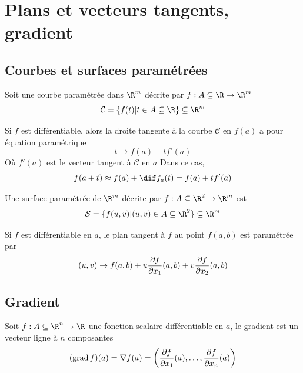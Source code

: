 
\section{Plans et vecteurs tangents, gradient}

\subsection{Courbes et surfaces paramétrées}

\begin{mydef}
	Soit une courbe paramétrée dans $\R^m$ décrite par $f : A \subseteq \R \to \R^m$
	\[ \mathcal{C} = \{ f(t) | t \in A \subseteq \R \} \subseteq \R^m \]
\end{mydef}

\begin{myform}
	Si $f$ est différentiable, alors la droite tangente à la courbe $\mathcal{C}$ en $f(a)$ a pour équation paramétrique
	\[ t \to f(a) + t f'(a) \]
	Où $f'(a)$ est le vecteur tangent à $\mathcal{C}$ en $a$
	Dans ce cas,
	\[ f(a + t) \approx f(a) + \dif f_a(t) = f(a) + t f'(a) \]
\end{myform}

\begin{mydef}
	Une surface paramétrée de $\R^m$ décrite par $f : A \subseteq \R^2 \to \R^m$ est
	\[ \mathcal{S} = \{ f(u,v) | (u,v) \in A \subseteq \R^2 \} \subseteq \R^m \]
\end{mydef}

\begin{myform}
	Si $f$ est différentiable en $a$, le plan tangent à $f$ au point $f(a,b)$ est paramétrée par
	\[ (u,v) \to f(a,b) + u \frac{\partial f}{\partial x_1} (a,b) + v \frac{\partial f}{\partial x_2}(a,b) \]
\end{myform}

\subsection{Gradient}

\begin{mydef}[Gradient] Soit $f : A \subseteq \R^n \to \R$ une fonction scalaire différentiable en $a$, le gradient est un vecteur ligne à $n$ composantes
	\[ (\operatorname{grad} f)(a) = \nabla f(a) = \left( \frac{\partial f}{\partial x_1}(a) , \dots, \frac{\partial f}{\partial x_n}(a) \right) \]
\end{mydef}

